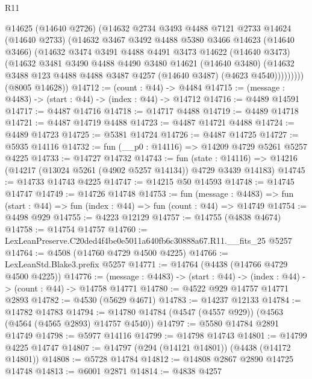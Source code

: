 \begin{lexlean}{R11}
\begin{coremodule}
            @14625
            (@14640 @2726)
            (@14632
              @2734
              @3493
              @4488
              @7121
              @2733
              @14624
              (@14640 @2733)
              (@14632
                @3467
                @3492
                @4488
                @5380
                @3466
                @14623
                (@14640 @3466)
                (@14632
                  @3474
                  @3491
                  @4488
                  @4491
                  @3473
                  @14622
                  (@14640 @3473)
                  (@14632
                    @3481
                    @3490
                    @4488
                    @4490
                    @3480
                    @14621
                    (@14640 @3480)
                    (@14632 @3488 @123 @4488 @4488 @3487 @4257 (@14640 @3487) (@4623 @4540)))))))))
      (@8005 @14628))
@14712 := (count : @44) -> @4484
@14715 := (message : @4483) -> (start : @44) -> (index : @44) -> @14712
@14716 := @4489 @14591
@14717 := @4487 @14716
@14718 := @14717 @4488
@14719 := @4489 @14718
@14721 := @4487 @14719 @4488
@14723 := @4487 @14721 @4488
@14724 := @4489 @14723
@14725 := @5381 @14724
@14726 := @4487 @14725
@14727 := @5935 @14116
@14732 := fun (__p0 : @14116) => @14209 @4729 @5261 @5257 @4225
@14733 := @14727 @14732
@14743 := fun (state : @14116) =>
  @14216 (@14217 (@13024 @5261 (@4902 @5257 @14134)) @4729 @3439 @14183)
@14745 := @14733 @14743 @4225
@14747 := @14215 @50 @14593
@14748 := @14745 @14747
@14749 := @14726 @14748
@14753 := fun (message : @4483) =>
  fun (start : @44) => fun (index : @44) => fun (count : @44) => @14749
@14754 := @4498 @929
@14755 := @4223 @12129
@14757 := @14755 (@4838 @4674)
@14758 := @14754 @14757
@14760 := LexLeanPreserve.C20ded4f4be0e5011a640fb6c30888a67.R11.__fits_25 @5257
@14764 := @4508 (@14760 @4729 @4500 @4225)
@14766 := LexLeanStd.Blake3.prefix @5257
@14771 := @14764 (@4438 (@14766 @4729 @4500 @4225))
@14776 := (message : @4483) -> (start : @44) -> (index : @44) -> (count : @44) -> @14758 @14771
@14780 := @4522 @929 @14757 @14771 @2893
@14782 := @4530 (@5629 @4671)
@14783 := @14237 @12133
@14784 := @14782 @14783
@14794 := @14780 @14784 (@4547 (@4557 @929)) (@4563 (@4564 (@4565 @2893) @14757 @4540))
@14797 := @5580 @14784 @2891 @14749
@14798 := @5977 @14116
@14799 := @14798 @14743
@14801 := @14799 @4225 @14747
@14807 := @14797 (@294 (@14121 @14801)) (@4438 (@14172 @14801))
@14808 := @5728 @14784
@14812 := @14808 @2867 @2890 @14725 @14748
@14813 := @6001 @2871
@14814 := @4838 @4257

\end{coremodule}
\end{lexlean}
